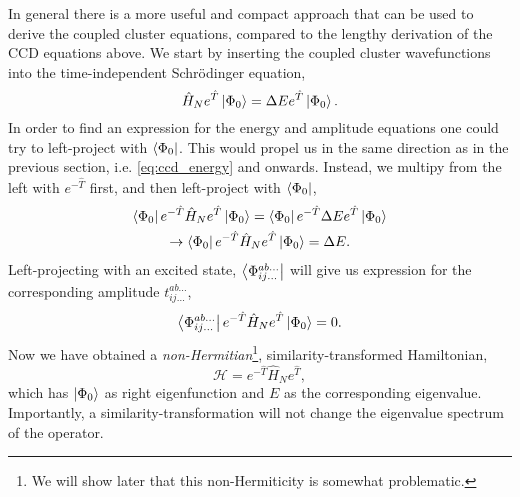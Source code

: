 In general there is a more useful and compact approach that can be used to derive 
the coupled cluster equations, compared to the lengthy derivation of the CCD 
equations above. We start by inserting the coupled cluster wavefunctions into the 
time-independent Schrödinger equation,
\begin{equation}
    \hat{H}_Ne^{\hat{T}}\ket{\Phi_0} = \Delta E e^{\hat{T}}\ket{\Phi_0}.
\end{equation} 
In order to find an expression for the energy and amplitude equations one could 
try to left-project with $\bra{\Phi_0}$. This would propel us in the same 
direction as in the previous section, i.e. \autoref{eq:ccd_energy} and onwards.
Instead, we multipy 
from the left with $e^{-\hat{T}}$ first, and then left-project with $\bra{\Phi_0}$,
\begin{equation}
    \label{eq:cc_energy}
    \begin{gathered}
    \bra{\Phi_0} e^{-\hat{T}}\hat{H}_Ne^{\hat{T}} \ket{\Phi_0} 
    = \bra{\Phi_0} e^{-\hat{T}} \Delta E e^{\hat{T}} \ket{\Phi_0} \\
    \to \bra{\Phi_0} e^{-\hat{T}} \hat{H}_N e^{\hat{T}} \ket{\Phi_0}
    = \Delta E.
    \end{gathered}
\end{equation}
Left-projecting with an excited state, $\bra{\Phi^{ab\dots}_{ij\dots}}$ will give us 
expression for the corresponding amplitude $t^{ab\dots}_{ij\dots}$,
\begin{equation}
    \label{eq:cc_amplitude}
    \bra{\Phi^{ab\dots}_{ij\dots}} e^{-\hat{T}}\hat{H}_Ne^{\hat{T}}\ket{\Phi_0} = 0.
\end{equation}
Now we have obtained a \emph{non-Hermitian}\footnote{We will show later that this 
non-Hermiticity is somewhat problematic.}, similarity-transformed Hamiltonian,
\begin{equation}
    \mathscr{H} = e^{-\hat{T}}\hat{H}_Ne^{\hat{T}},
\end{equation}
which has $\ket{\Phi_0}$ as right eigenfunction and $E$ as the corresponding eigenvalue.
Importantly, a similarity-transformation will not change the eigenvalue spectrum of the 
operator.

